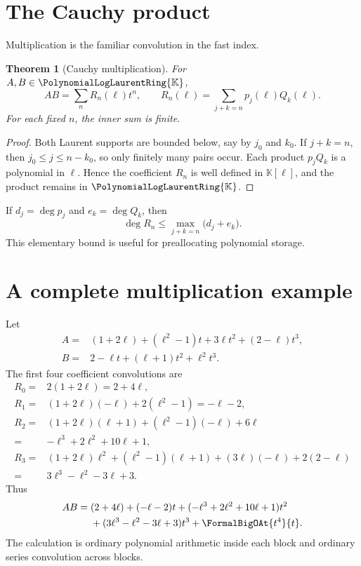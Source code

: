 \documentclass[11pt,oneside,openany]{book}
\newtheorem{theorem}{Theorem}[chapter]
\newcommand{\K}{\mathbb{K}}
\newcommand{\Pring}{\PolynomialLogLaurentRing{\K}}
\begin{document}
\section{The Cauchy product}
Multiplication is the familiar convolution in the fast index.

\begin{theorem}[Cauchy multiplication]\label{thm:cauchymult}
For \(A,B\in\Pring\),
\begin{equation}\label{eq:cauchy}
 AB=\sum_nR_n(\ell)t^n,
 \qquad
 R_n(\ell)=\sum_{j+k=n}p_j(\ell)Q_k(\ell).
\end{equation}
For each fixed \(n\), the inner sum is finite.
\end{theorem}

\begin{proof}
Both Laurent supports are bounded below, say by \(j_0\) and \(k_0\).  If
\(j+k=n\), then \(j_0\leq j\leq n-k_0\), so only finitely many pairs occur.
Each product \(p_jQ_k\) is a polynomial in \(\ell\).  Hence the coefficient
\(R_n\) is well defined in \(\K[\ell]\), and the product remains in \(\Pring\).
\end{proof}

If \(d_j=\deg p_j\) and \(e_k=\deg Q_k\), then
\begin{equation}\label{eq:degreeboundproduct}
 \deg R_n\leq
 \max_{j+k=n}\bigl(d_j+e_k\bigr).
\end{equation}
This elementary bound is useful for preallocating polynomial storage.

\section{A complete multiplication example}
Let
\begin{align*}
 A={}&(1+2\ell)+(\ell^2-1)t+3\ell t^2+(2-\ell)t^3,\\
 B={}&2-\ell t+(\ell+1)t^2+\ell^2t^3.
\end{align*}
The first four coefficient convolutions are
\begin{align*}
 R_0={}&2(1+2\ell)=2+4\ell,\\
 R_1={}&(1+2\ell)(-\ell)+2(\ell^2-1)=-\ell-2,\\
 R_2={}&(1+2\ell)(\ell+1)+(\ell^2-1)(-\ell)+6\ell\\
      ={}&-\ell^3+2\ell^2+10\ell+1,\\
 R_3={}&(1+2\ell)\ell^2+(\ell^2-1)(\ell+1)
          +(3\ell)(-\ell)+2(2-\ell)\\
      ={}&3\ell^3-\ell^2-3\ell+3.
\end{align*}
Thus
\begin{align}\label{eq:multworked}
 AB={}&(2+4\ell)+(-\ell-2)t
 +(-\ell^3+2\ell^2+10\ell+1)t^2\notag\\
 &+(3\ell^3-\ell^2-3\ell+3)t^3+\FormalBigOAt{t^4}{t}.
\end{align}
The calculation is ordinary polynomial arithmetic inside each block and
ordinary series convolution across blocks.
\end{document}
